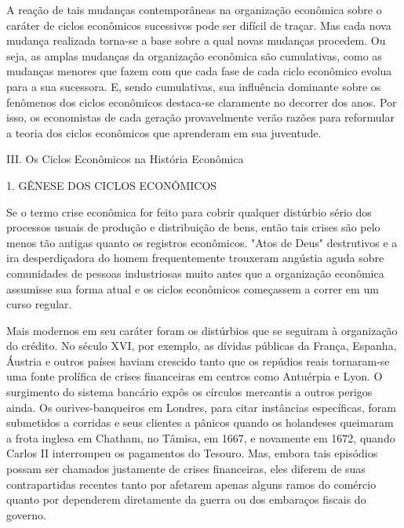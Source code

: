 \documentclass[12pt]{article}
\begin{document}
A reação de tais mudanças contemporâneas na organização econômica sobre o caráter de ciclos econômicos sucessivos pode ser difícil de traçar. Mas cada nova mudança realizada torna-se a base sobre a qual novas mudanças procedem. Ou seja, as amplas mudanças da organização econômica são cumulativas, como as mudanças menores que fazem com que cada fase de cada ciclo econômico evolua para a sua sucessora. E, sendo cumulativas, sua influência dominante sobre os fenômenos dos ciclos econômicos destaca-se claramente no decorrer dos anos. Por isso, os economistas de cada geração provavelmente verão razões para reformular a teoria dos ciclos econômicos que aprenderam em sua juventude.

III. Os Ciclos Econômicos na História Econômica

1. GÊNESE DOS CICLOS ECONÔMICOS

Se o termo crise econômica for feito para cobrir qualquer distúrbio sério dos processos usuais de produção e distribuição de bens, então tais crises são pelo menos tão antigas quanto os registros econômicos. "Atos de Deus" destrutivos e a ira desperdiçadora do homem frequentemente trouxeram angústia aguda sobre comunidades de pessoas industriosas muito antes que a organização econômica assumisse sua forma atual e os ciclos econômicos começassem a correr em um curso regular.

Mais modernos em seu caráter foram os distúrbios que se seguiram à organização do crédito. No século XVI, por exemplo, as dívidas públicas da França, Espanha, Áustria e outros países haviam crescido tanto que os repúdios reais tornaram-se uma fonte prolífica de crises financeiras em centros como Antuérpia e Lyon. O surgimento do sistema bancário expôs os círculos mercantis a outros perigos ainda. Os ourives-banqueiros em Londres, para citar instâncias específicas, foram submetidos a corridas e seus clientes a pânicos quando os holandeses queimaram a frota inglesa em Chatham, no Tâmisa, em 1667, e novamente em 1672, quando Carlos II interrompeu os pagamentos do Tesouro. Mas, embora tais episódios possam ser chamados justamente de crises financeiras, eles diferem de suas contrapartidas recentes tanto por afetarem apenas alguns ramos do comércio quanto por dependerem diretamente da guerra ou dos embaraços fiscais do governo.
\end{document}
